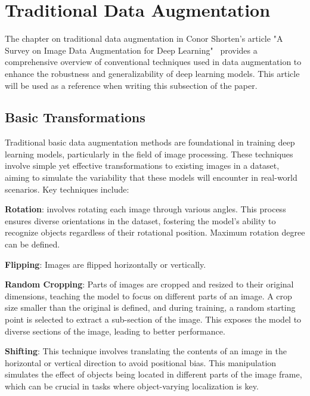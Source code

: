 \section{Traditional Data Augmentation}
\label{ssec:augmentationTraditional}

The chapter on traditional data augmentation in Conor Shorten's article "A Survey on Image Data Augmentation for Deep Learning"~\cite{ImageDataAugmentationSurvey} provides a comprehensive overview of conventional techniques used in data augmentation to enhance the robustness and generalizability of deep learning models. This article will be used as a reference when writing this subsection of the paper.

\subsection{Basic Transformations}
\label{ssec:basicTransformations}


Traditional basic data augmentation methods are foundational in training deep learning models, particularly in the field of image processing. These techniques involve simple yet effective transformations to existing images in a dataset, aiming to simulate the variability that these models will encounter in real-world scenarios. Key techniques include:


\textbf{Rotation}: involves rotating each image through various angles. This process ensures diverse orientations in the dataset, fostering the model's ability to recognize objects regardless of their rotational position. Maximum rotation degree can be defined.

\textbf{Flipping}: Images are flipped horizontally or vertically. 

\textbf{Random Cropping}: Parts of images are cropped and resized to their original dimensions, teaching the model to focus on different parts of an image. A crop size smaller than the original is defined, and during training, a random starting point is selected to extract a sub-section of the image. This exposes the model to diverse sections of the image, leading to better performance.

\textbf{Shifting}: This technique involves translating the contents of an image in the horizontal or vertical direction to avoid positional bias. This manipulation simulates the effect of objects being located in different parts of the image frame, which can be crucial in tasks where object-varying localization is key.

